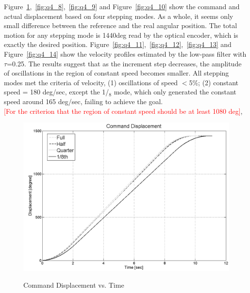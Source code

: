 \documentclass{article}
\newcommand{\xxx}[1]{\textcolor{red}{#1}}
\theoremstyle{plain}
\theoremstyle{definition}
\theoremstyle{remark}
\begin{document}
Figure~\ref{fig:q4_7},~\ref{fig:q4_8},~\ref{fig:q4_9} and Figure~\ref{fig:q4_10} show the command and actual displacement based on four stepping modes. As a whole, it seems only small difference between the reference and the real angular position. The total motion for any stepping mode is 1440deg read by the optical encoder, which is exactly the desired position. Figure~\ref{fig:q4_11},~\ref{fig:q4_12},~\ref{fig:q4_13} and Figure~\ref{fig:q4_14} show the velocity profiles estimated by the low-pass filter with $\tau$=0.25. The results suggest that as the increment step decreases, the amplitude of oscillations in the region of constant speed becomes smaller. All stepping modes met the criteria of velocity, (1) oscillations of speed $<$5\%; (2) constant speed = 180 deg/sec, except the 1/${_8}$ mode, which only generated the constant speed around 165 deg/sec, failing to achieve the goal. \\

\xxx{[For the criterion that the region of constant speed should be at least 1080 deg]}, 

\begin{figure}[hbt]
\begin{center}
\includegraphics[width=12cm]{Q4_CommandPosition.png}
\caption{Command Displacement vs. Time} \label{tex}
\label{fig:q4_7}
\end{center}
\end{figure}
\end{document}
